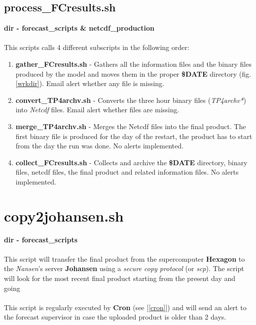 \documentclass[12pt,a4paper]{report}
\begin{document}
\subsection{process\_FCresults.sh}
\label{processfcresults}
\textbf{dir - forecast\_scripts \& netcdf\_production}
\\ \\
This scripts calls 4 different subscripts in the following order:
\begin{enumerate}
\item \textbf{gather\_FCresults.sh} - Gathers all the information files and the binary files produced by the model and moves them in the proper \textbf{\$DATE} directory (fig. \ref{wrkdir}). Email alert whether any file is missing.
\item \textbf{convert\_TP4archv.sh} - Converts the three hour binary files (\textit{TP4archv*}) into \textit{Netcdf} files. Email alert whether files are missing.
\item \textbf{merge\_TP4archv.sh} - Merges the Netcdf files into the final product. The first binary file is produced for the day of the restart, the product has to start from the day the run was done. No alerts implemented.
\item \textbf{collect\_FCresults.sh} - Collects and archive the \textbf{\$DATE} directory, binary files, netcdf files, the final product and related information files. No alerts implemented.
\end{enumerate}

\section{copy2johansen.sh}
\label{copy2johansen}
\textbf{dir - forecast\_scripts}
\\ \\
This script will transfer the final product from the supercomputer \textbf{Hexagon} to the \textit{Nansen}'s server \textbf{Johansen} using a \textit{secure copy protocol} (or \textit{scp}). The script will look for the most recent final product starting from the present day and going 
\\ \\
This script is regularly executed by \textbf{Cron} (see [\ref{cron}]) and will send an alert to the forecast supervisor in case the uploaded product is older than 2 days.

%
%
%

\end{document}
